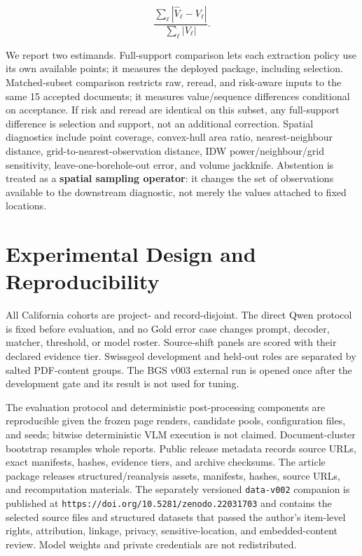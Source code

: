 \documentclass[a4paper,fleqn]{cas-sc}
\begin{document}
\[
\frac{\sum_\ell|\hat V_\ell-V_\ell|}{\sum_\ell|V_\ell|}.
\]

We report two estimands. Full-support comparison lets each extraction policy use its own available points; it measures the deployed package, including selection. Matched-subset comparison restricts raw, reread, and risk-aware inputs to the same 15 accepted documents; it measures value/sequence differences conditional on acceptance. If risk and reread are identical on this subset, any full-support difference is selection and support, not an additional correction. Spatial diagnostics include point coverage, convex-hull area ratio, nearest-neighbour distance, grid-to-nearest-observation distance, IDW power/neighbour/grid sensitivity, leave-one-borehole-out error, and volume jackknife. Abstention is treated as a \textbf{spatial sampling operator}: it changes the set of observations available to the downstream diagnostic, not merely the values attached to fixed locations.

\section{Experimental Design and Reproducibility}

All California cohorts are project- and record-disjoint. The direct Qwen protocol is fixed before evaluation, and no Gold error case changes prompt, decoder, matcher, threshold, or model roster. Source-shift panels are scored with their declared evidence tier. Swissgeol development and held-out roles are separated by salted PDF-content groups. The BGS v003 external run is opened once after the development gate and its result is not used for tuning.

The evaluation protocol and deterministic post-processing components are reproducible given the frozen page renders, candidate pools, configuration files, and seeds; bitwise deterministic VLM execution is not claimed. Document-cluster bootstrap resamples whole reports. Public release metadata records source URLs, exact manifests, hashes, evidence tiers, and archive checksums. The article package releases structured/reanalysis assets, manifests, hashes, source URLs, and recomputation materials. The separately versioned \texttt{data-v002} companion is published at \texttt{https://doi.org/10.5281/zenodo.22031703} \citep{du2026datav002} and contains the selected source files and structured datasets that passed the author's item-level rights, attribution, linkage, privacy, sensitive-location, and embedded-content review. Model weights and private credentials are not redistributed.
\end{document}
